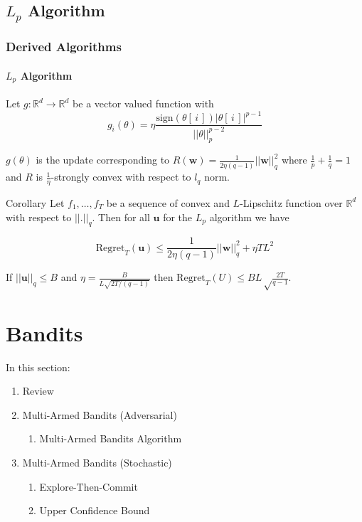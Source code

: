 \documentclass{beamer}
\newcommand{\R}{\mathbb{R}}
\newcommand{\uu}{\mathbf{u}}
\newcommand{\w}{\mathbf{w}}
\begin{document}
\subsection{$L_p$ Algorithm}
\begin{frame}
\frametitle{Derived Algorithms}
\framesubtitle{$L_p$ Algorithm}
Let $g: \R^d \to \R^d$ be a vector valued function with 
{\scriptsize
$$g_i(\theta) = \eta \frac{\mathrm{sign}(\theta[\, i\,]) \Big|\theta[\, i\,]\Big|^{p-1}}{||\theta||_p^{p-2}}$$
}

$g(\theta)$ is the update corresponding to  $R(\w) = \frac{1}{2\eta (q-1)}||\w||_q^2$ where $\frac{1}{p} + \frac{1}{q} = 1$ and $R$ is $\frac{1}{\eta}$-strongly convex with respect to $l_q$ norm.

\begin{block}{Corollary}
Let $f_1, \dots, f_T$ be a sequence of convex and $L$-Lipschitz function over $\R^d$ with respect to $||.||_q$. Then for all $\uu$ for the $L_p$ algorithm we have

\vspace{-0.3cm}
{\small$$\mathrm{Regret}_T(\uu) \leq \frac{1}{2\eta(q-1)}||\w||_q^2 + \eta T L^2$$}
\end{block}

\pause
If $||\uu||_q \leq B$ and $\eta = \frac{B}{L\sqrt{2T/(q-1)}}$ then $\mathrm{Regret}_T(U) \leq BL\sqrt\frac{2T}{q-1}$.
\end{frame}



\section{Bandits}
\frame{\sectionpage}


\begin{frame}
In this section:

\begin{enumerate}
\item Review
\item Multi-Armed Bandits (Adversarial)
\begin{enumerate}
\item Multi-Armed Bandits Algorithm
\end{enumerate}
\item Multi-Armed Bandits (Stochastic)
\begin{enumerate}
\item Explore-Then-Commit
\item Upper Confidence Bound
\end{enumerate}

\end{enumerate}
\end{frame}
\end{document}

